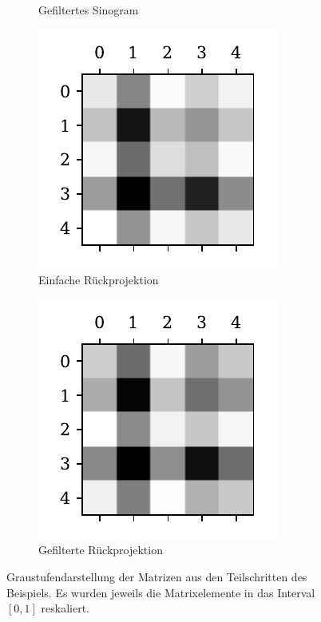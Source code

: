 \documentclass[slug=PET, room=Andreas-Schubert-Bau\,\ 424A, supervisor=Carsten\ Bittrich, coursedate=10.\ 01.\ 2020]{../../Lab_Report_LaTeX/lab_report}
\begin{document}
\begin{figure}[htp]
\begin{subfigure}[t]{.25\textwidth}
    \caption{Gefiltertes Sinogram}
    \label{fig:theory-convoluted}
  \end{subfigure}
  \begin{subfigure}[t]{.25\textwidth}
    \centering
    \includegraphics[width=.6\textwidth]{../auswertung/figs/theory/rec_simple.pdf}
    \caption{Einfache R\"uckprojektion}
    \label{fig:theory-rec_simple}
  \end{subfigure}
  \begin{subfigure}[t]{.25\textwidth}
    \centering
    \includegraphics[width=.6\textwidth]{../auswertung/figs/theory/rec_filtered.pdf}
    \caption{Gefilterte R\"uckprojektion}
    \label{fig:theory-rec_filtered}
  \end{subfigure}
  \caption[Graustufendarstellung der
  Beispielmatrizen]{Graustufendarstellung der Matrizen aus den
    Teilschritten des Beispiels. Es wurden jeweils die Matrixelemente
    in das Interval \([0,1]\) reskaliert.}
  \label{fig:graubei}
\end{figure}
\end{document}
